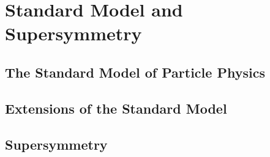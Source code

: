 \chapter{Standard Model and Supersymmetry}
\label{chap:SMSUSY}

\section{The Standard Model of Particle Physics}
\label{sec:smsusy:sm}

\section{Extensions of the Standard Model}
\label{sec:smsusy:bsm}


\section{Supersymmetry}
\label{sec:smsusy:susy}

